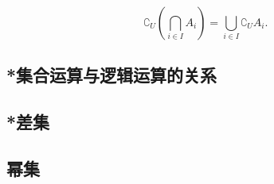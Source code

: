 \begin{equation}
\complement_U(\bigcap_{i\in I} A_i)=\bigcup_{i\in I} {\complement_UA_i}.~
\end{equation}


\subsection{*集合运算与逻辑运算的关系}



\subsection{*差集}

\subsection{幂集}